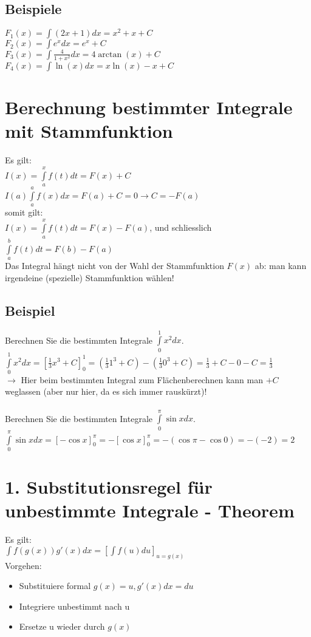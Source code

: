 \documentclass[../main.tex]{subfiles}
\begin{document}
\subsection{Beispiele}
$F_1(x) = \int (2x + 1)dx = x^2 + x + C$ \\ [7pt]
$F_2(x) = \int e^xdx = e^x + C$ \\ [7pt]
$F_3(x) = \int \frac{4}{1+x^2}dx = 4 \arctan(x) + C$ \\ [7pt]
$F_4(x) = \int \ln(x)dx = x \ln(x) - x + C$

\section{Berechnung bestimmter Integrale mit Stammfunktion}
Es gilt: \\
$I(x) = \int\limits_a^x f(t)dt = F(x) + C$ \\
$I(a) \int\limits_a^a f(x)dx = F(a) + C = 0 \longrightarrow C = -F(a)$ \\
somit gilt: \\
$I(x) = \int\limits_a^x f(t)dt = F(x) - F(a)$, und schliesslich $\int\limits_a^b f(t)dt = F(b) - F(a)$ \\
Das Integral hängt nicht von der Wahl der Stammfunktion $F(x)$ ab: man kann irgendeine (spezielle) Stammfunktion wählen!

\subsection{Beispiel}
Berechnen Sie die bestimmten Integrale $\int\limits_0^1 x^2dx$. \\
$\int\limits_0^1 x^2dx = \left[\frac{1}{3}x^3+C\right]_0^1 = (\frac{1}{3}1^3 + C) - (\frac{1}{3}0^3 +C) = \frac{1}{3} + C -0 -C = \frac{1}{3}$ \\
$\longrightarrow$ Hier beim bestimmten Integral zum Flächenberechnen kann man $+C$ weglassen (aber nur hier, da es sich immer rauskürzt)! \\
\\
Berechnen Sie die bestimmten Integrale $\int\limits_0^\pi \sin xdx$. \\
$\int\limits_0^\pi \sin xdx = \left[-\cos x \right]_0^\pi = -\left[\cos x \right]_0^\pi = -(\cos \pi - \cos 0) = -(-2) = 2$

\section{1. Substitutionsregel für unbestimmte Integrale - Theorem}
Es gilt: \\
$\int f(g(x))g'(x)dx = \left[ \int f(u)du\right]_{u=g(x)}$ \\
Vorgehen:
\begin{itemize}
    \item Substituiere formal $g(x) = u, g'(x)dx = du$
    \item Integriere unbestimmt nach u
    \item Ersetze u wieder durch $g(x)$
\end{itemize}
\end{document}
